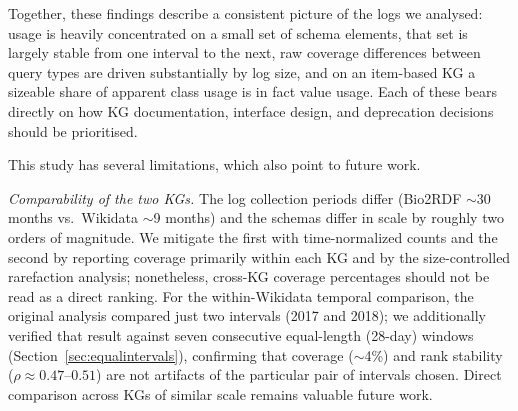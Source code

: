 \documentclass[sw]{iosart2x}
\begin{document}
Together, these findings describe a consistent picture of the logs we analysed: usage is heavily concentrated on a small set of schema elements, that set is largely stable from one interval to the next, raw coverage differences between query types are driven substantially by log size, and on an item-based KG a sizeable share of apparent class usage is in fact value usage. Each of these bears directly on how KG documentation, interface design, and deprecation decisions should be prioritised.

This study has several limitations, which also point to future work.

\emph{Comparability of the two KGs.} The log collection periods differ (Bio2RDF $\sim$30 months vs.\ Wikidata $\sim$9 months) and the schemas differ in scale by roughly two orders of magnitude. We mitigate the first with time-normalized counts and the second by reporting coverage primarily within each KG and by the size-controlled rarefaction analysis; nonetheless, cross-KG coverage percentages should not be read as a direct ranking. For the within-Wikidata temporal comparison, the original analysis compared just two intervals (2017 and 2018); we additionally verified that result against seven consecutive equal-length (28-day) windows (Section~\ref{sec:equalintervals}), confirming that coverage ($\sim$4\%) and rank stability ($\rho \approx 0.47$--$0.51$) are not artifacts of the particular pair of intervals chosen. Direct comparison across KGs of similar scale remains valuable future work.
\end{document}
